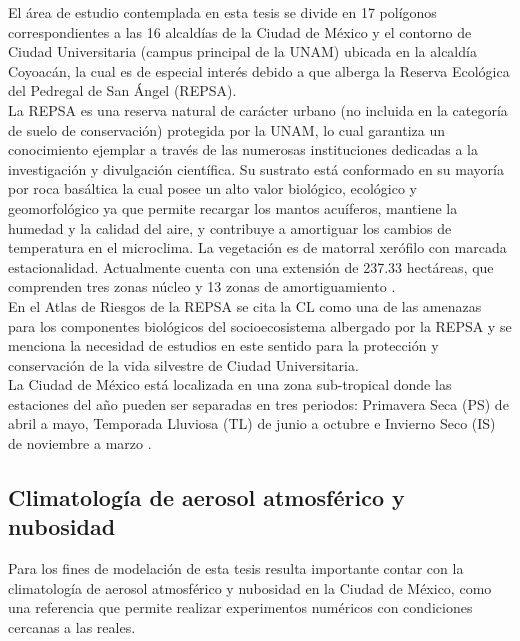\newpage

El área de estudio contemplada en esta tesis se divide en 17 polígonos correspondientes a las 16 alcaldías de la Ciudad de México y el contorno de Ciudad Universitaria (campus principal de la UNAM) ubicada en la alcaldía Coyoacán, la cual es de especial interés debido a que alberga la Reserva Ecológica del Pedregal de San Ángel (REPSA).\\

La REPSA es una reserva natural de carácter urbano (no incluida en la categoría de suelo de conservación) protegida por la UNAM, lo cual garantiza un conocimiento ejemplar a través de las numerosas instituciones dedicadas a la investigación y divulgación científica. Su sustrato está conformado en su mayoría por roca basáltica la cual posee un alto valor biológico, ecológico y geomorfológico ya que permite recargar los mantos acuíferos, mantiene la humedad y la calidad del aire, y contribuye a amortiguar los cambios de temperatura en el microclima. La vegetación es de matorral xerófilo con marcada estacionalidad. Actualmente cuenta con una extensión de 237.33 hectáreas, que comprenden tres zonas núcleo y 13 zonas de amortiguamiento \citep{REPSA2019}.\\

En el Atlas de Riesgos de la REPSA \citep{AtlasREPSA} se cita la CL como una de las amenazas para los componentes biológicos del socioecosistema albergado por la REPSA y se menciona la necesidad de estudios en este sentido para la protección y conservación de la vida silvestre de Ciudad Universitaria.\\

La Ciudad de México está localizada en una zona sub-tropical donde las estaciones del año pueden ser separadas en tres periodos: Primavera Seca (PS) de abril a mayo, Temporada Lluviosa (TL) de junio a octubre e Invierno Seco (IS) de noviembre a marzo \citep{Jauregui2002}.\\

\subsection{Climatología de aerosol atmosférico y nubosidad}

Para los fines de modelación de esta tesis resulta importante contar con la climatología de aerosol atmosférico y nubosidad en la Ciudad de México, como una referencia que permite realizar experimentos numéricos con condiciones cercanas a las reales.\\

